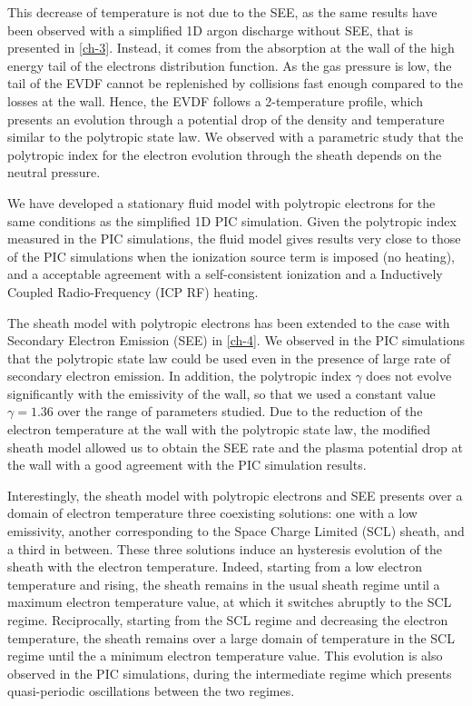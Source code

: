     This decrease of temperature is not due to the SEE, as the same results have been observed with a simplified 1D argon discharge without SEE, that is presented in \cref{ch-3}.
    Instead, it comes from the absorption at the wall of the high energy tail of the electrons distribution function.
    As the gas pressure is low, the tail of the EVDF cannot be replenished by collisions fast enough compared to the losses at the wall.
    Hence, the EVDF follows a 2-temperature profile, which presents an evolution through a potential drop of the density and temperature similar to the polytropic state law. 
    We observed with a parametric study that the polytropic index for the electron evolution through the sheath depends on the neutral pressure.

    We have developed a stationary fluid model with polytropic electrons for the same conditions as the simplified 1D PIC simulation.
    Given the polytropic index measured in the PIC simulations, the fluid model gives results very close to those of the PIC simulations when the ionization source term is imposed (no heating), and a acceptable agreement with a self-consistent ionization and a Inductively Coupled Radio-Frequency (ICP RF) heating.

    \vspace{1ex}
    The sheath model with polytropic electrons has been extended to the case with Secondary Electron Emission (SEE) in \cref{ch-4}.
    We observed in the PIC simulations that the polytropic state law could be used even in the presence of large rate of secondary electron emission.
    In addition, the polytropic index $\gamma$ does not evolve significantly with the emissivity of the wall, so that we used a constant value $\gamma=1.36$ over the range of parameters studied.
    Due to the reduction of the electron temperature at the wall with the polytropic state law, the modified sheath model allowed us to obtain the SEE rate and the plasma potential drop at the wall with a good agreement with the PIC simulation results.

    Interestingly, the sheath model with polytropic electrons and SEE presents over a domain of electron temperature three coexisting solutions\string: one with a low emissivity, another corresponding to the Space Charge Limited (SCL) sheath, and a third in between.
    These three solutions induce an hysteresis evolution of the sheath with the electron temperature.
    Indeed, starting from a low electron temperature and rising, the sheath remains in the usual sheath regime until a maximum electron temperature value, at which it switches abruptly to the SCL regime.
    Reciprocally, starting from the SCL regime and decreasing the electron temperature, the sheath remains over a large domain of temperature in the SCL regime until the a minimum electron temperature value.
    This evolution is also observed in the PIC simulations, during the intermediate regime which presents quasi-periodic oscillations between the two regimes.

